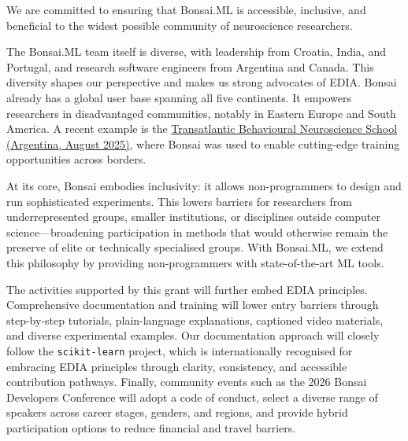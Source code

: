 We are committed to ensuring that Bonsai.ML is accessible, inclusive, and 
beneficial to the widest possible community of neuroscience researchers.

The Bonsai.ML team itself is diverse, with leadership from Croatia, India, and
Portugal, and research software engineers from Argentina and Canada.  This
diversity shapes our perspective and makes us strong advocates of EDIA.  Bonsai
already has a global user base spanning all five continents. It empowers
researchers in disadvantaged communities, notably in Eastern Europe and South
America. A recent example is the
\href{https://nenckiopenlab.org/tbns2025/}{Transatlantic Behavioural
Neuroscience School (Argentina, August 2025)}, where Bonsai was used to enable
cutting-edge training opportunities across borders.

At its core, Bonsai embodies inclusivity: it allows non-programmers to design 
and run sophisticated experiments. This lowers barriers for researchers from 
underrepresented groups, smaller institutions, or disciplines outside computer 
science---broadening participation in methods that would otherwise remain the 
preserve of elite or technically specialised groups. With Bonsai.ML, we extend 
this philosophy by providing non-programmers with state-of-the-art ML tools.

The activities supported by this grant will further embed EDIA principles. 
Comprehensive documentation and training will lower entry barriers through 
step-by-step tutorials, plain-language explanations, captioned video materials, 
and diverse experimental examples.
Our documentation approach will closely follow 
the \texttt{scikit-learn} project, which is internationally recognised for 
embracing EDIA principles through clarity, consistency, and accessible 
contribution pathways.
%
Finally, community events such as the 2026 Bonsai Developers Conference will 
adopt a code of conduct, select a diverse range of speakers across career 
stages, genders, and regions, and provide hybrid participation options to
reduce financial and travel barriers.

